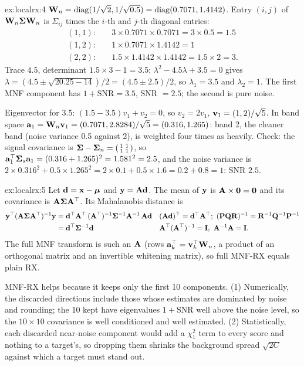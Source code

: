 \begin{solution}{ex:localrx:4}
$\mathbf{W}_n = \operatorname{diag}(1/\sqrt2, 1/\sqrt{0.5}) = \operatorname{diag}(0.7071, 1.4142)$. Entry $(i,j)$ of
$\mathbf{W}_n\boldsymbol{\Sigma}\mathbf{W}_n$ is $\Sigma_{ij}$ times the $i$-th and $j$-th diagonal entries:
\begin{align*}
(1,1):&\quad 3\times0.7071\times0.7071 = 3\times0.5 = 1.5\\
(1,2):&\quad 1\times0.7071\times1.4142 = 1\\
(2,2):&\quad 1.5\times1.4142\times1.4142 = 1.5\times2 = 3 .
\end{align*}
Trace $4.5$, determinant $1.5\times3 - 1 = 3.5$; $\lambda^2 - 4.5\lambda + 3.5 = 0$ gives
$\lambda = (4.5 \pm \sqrt{20.25 - 14})/2 = (4.5 \pm 2.5)/2$, so $\lambda_1 = 3.5$ and $\lambda_2 = 1$.
The first MNF component has $1 + \text{SNR} = 3.5$, SNR $= 2.5$; the second is pure noise.

Eigenvector for 3.5: $(1.5 - 3.5)v_1 + v_2 = 0$, so $v_2 = 2v_1$, $\mathbf{v}_1 = (1, 2)/\sqrt5$. In band
space $\mathbf{a}_1 = \mathbf{W}_n\mathbf{v}_1 = (0.7071, 2.8284)/\sqrt5 = (0.316, 1.265)$: band 2, the cleaner
band (noise variance 0.5 against 2), is weighted four times as heavily. Check: the signal covariance is
$\boldsymbol{\Sigma} - \boldsymbol{\Sigma}_n = \begin{psmallmatrix} 1 & 1\\ 1 & 1\end{psmallmatrix}$, so
$\mathbf{a}_1^{\top}\boldsymbol{\Sigma}_s\mathbf{a}_1 = (0.316 + 1.265)^2 = 1.581^2 = 2.5$, and the noise variance is
$2\times0.316^2 + 0.5\times1.265^2 = 2\times0.1 + 0.5\times1.6 = 0.2 + 0.8 = 1$: SNR $2.5$.
\end{solution}

\begin{solution}{ex:localrx:5}
Let $\mathbf{d} = \mathbf{x} - \boldsymbol{\mu}$ and $\mathbf{y} = \mathbf{A}\mathbf{d}$. The mean of $\mathbf{y}$ is
$\mathbf{A}\times\mathbf{0} = \mathbf{0}$ and its covariance is $\mathbf{A}\boldsymbol{\Sigma}\mathbf{A}^{\top}$. Its Mahalanobis distance is
\begin{align*}
\vect{y}\T(\mat{A}\Cov\mat{A}\T)\inv\vect{y}
&= \vect{d}\T\mat{A}\T\,(\mat{A}\T)\inv\Cov\inv\mat{A}\inv\,\mat{A}\vect{d}
  && (\mat{A}\vect{d})\T = \vect{d}\T\mat{A}\T;\ (\mat{P}\mat{Q}\mat{R})\inv = \mat{R}\inv\mat{Q}\inv\mat{P}\inv\\
&= \vect{d}\T\Cov\inv\vect{d}
  && \mat{A}\T(\mat{A}\T)\inv = \mat{I},\ \mat{A}\inv\mat{A} = \mat{I}.
\end{align*}
The full MNF transform is such an $\mathbf{A}$ (rows $\mathbf{a}_k^{\top} = \mathbf{v}_k^{\top}\mathbf{W}_n$, a product of an
orthogonal matrix and an invertible whitening matrix), so full MNF-RX equals plain RX.

MNF-RX helps because it keeps only the first 10 components. (1) Numerically, the discarded directions
include those whose estimates are dominated by noise and rounding; the 10 kept have eigenvalues
$1 + \text{SNR}$ well above the noise level, so the $10\times10$ covariance is well conditioned and well
estimated. (2) Statistically, each discarded near-noise component would add a $\chi^2_1$ term to every
score and nothing to a target's, so dropping them shrinks the background spread $\sqrt{2C}$ against which
a target must stand out.
\end{solution}

